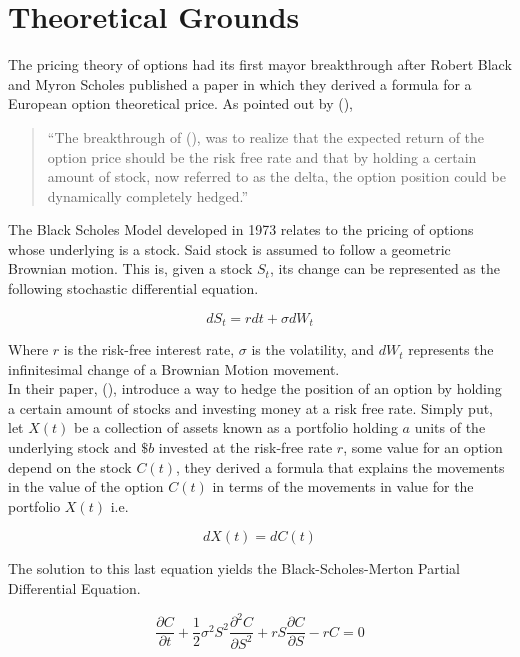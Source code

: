 \documentclass{article}
\newcommand{\Mycite}[1]{%
 \citeauthor{#1}(\citeyear{#1})}
\begin{document}
\section{Theoretical Grounds}
The pricing theory of options had its first mayor breakthrough after Robert Black and Myron Scholes published a paper in which they derived a formula for a European option theoretical price. As pointed out by \Mycite{pre_bs},

\begin{quote}
``The breakthrough of \Mycite{black_scholes}, was to realize that the expected return of the option price should be the risk free rate and that by holding a certain amount of stock, now referred to as the delta, the option position could be dynamically completely hedged.''
\end{quote} 

The Black Scholes Model developed in 1973 relates to the pricing of options whose underlying is a stock. Said stock is assumed to follow a geometric Brownian motion. This is, given a stock $S_t$, its change can be represented as the following stochastic differential equation.

\begin{equation}
    dS_t = r dt + \sigma dW_t 
\end{equation}

Where $r$ is the risk-free interest rate, $\sigma$ is the volatility, and $dW_t$ represents the infinitesimal change of a Brownian Motion movement.\\

In their paper, \Mycite{black_scholes}, introduce a way to hedge the position of an option by holding a certain amount of stocks and investing money at a risk free rate. Simply put, let $X(t)$ be a collection of assets known as a portfolio holding $a$ units of the underlying stock and $\$b$ invested at the risk-free rate $r$, some value for an option depend on the stock $C(t)$, they derived a formula that explains the movements in the value of the option $C(t)$ in terms of the movements in value for the portfolio $X(t)$ i.e.

\begin{equation}
    dX(t) = dC(t)
\end{equation}

The solution to this last equation yields the Black-Scholes-Merton Partial Differential Equation.

\begin{equation}
    \frac{\partial C}{\partial t} + \frac{1}{2}\sigma^2 S^2 \frac{\partial^2 C}{\partial S^2} + rS\frac{\partial C}{\partial S} - rC = 0  
\end{equation}\\
\end{document}
